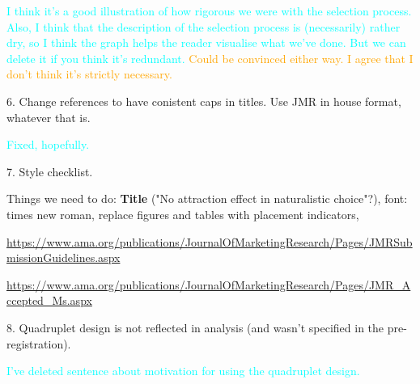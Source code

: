 \documentclass[12pt, a4paper]{article}
\newcommand{\AT}[1] {{\textcolor{cyan}{#1}}}
\newcommand{\TM}[1] {{\textcolor{orange}{#1}}}
\begin{document}
\AT{I think it's a good illustration of how rigorous we were with the selection process. Also, I think that the description of the selection process is (necessarily) rather dry, so I think the graph helps the reader visualise what we've done. But we can delete it if you think it's redundant.}
\TM{Could be convinced either way. I agree that I don't think it's strictly necessary.}


6. Change references to have conistent caps in titles. Use JMR in house format, whatever that is.

\AT{Fixed, hopefully.}


7. Style checklist.

Things we need to do: \textbf{Title} ("No attraction effect in naturalistic choice"?), font: times new roman, replace figures and tables with placement indicators, 


\AT{\url{https://www.ama.org/publications/JournalOfMarketingResearch/Pages/JMRSubmissionGuidelines.aspx}}

\AT{\url{https://www.ama.org/publications/JournalOfMarketingResearch/Pages/JMR_Accepted_Ms.aspx}}

8. Quadruplet design is not reflected in analysis (and wasn't specified in the pre-registration).

\AT{I've deleted sentence about motivation for using the quadruplet design.}




\end{document}
